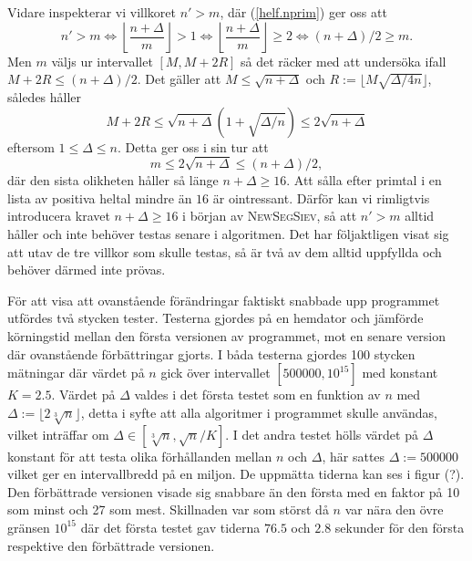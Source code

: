 Vidare inspekterar vi villkoret $n'>m$, där (\ref{helf.nprim}) ger oss att 
\begin{equation*}
    n'>m \iff
    \left\lfloor \frac{n+\Delta}{m} \right\rfloor > 1 \iff
    \left\lfloor \frac{n+\Delta}{m} \right\rfloor \geq 2 \iff
    (n+\Delta)/2\geq m.
\end{equation*}
Men $m$ väljs ur intervallet $[M,M+2R]$ så det räcker med att undersöka ifall $M+2R\leq(n+\Delta)/2$. 
Det gäller att $M\leq\sqrt{n+\Delta}$ och $R:=\lfloor M\sqrt{\Delta/4n}\rfloor$,
således håller 
\begin{equation*}
    M+2R \leq
    \sqrt{n+\Delta}\left(1+ \sqrt{\Delta/n}\right) \leq 2\sqrt{n+\Delta}
\end{equation*}
eftersom $1\leq\Delta\leq n$. Detta ger oss i sin tur att
\begin{equation*}
    m \leq 2\sqrt{n+\Delta} \leq (n+\Delta)/2,
\end{equation*}
där den sista olikheten håller så länge $n+\Delta\geq16$. 
Att sålla efter primtal i en lista av positiva heltal mindre än $16$ är ointressant.
Därför kan vi rimligtvis introducera kravet $n+\Delta\geq16$ i början av \textsc{NewSegSiev},
så att $n'>m$ alltid håller och inte behöver testas senare i algoritmen.
Det har följaktligen visat sig att utav de tre villkor som skulle testas, så är två av dem alltid uppfyllda och behöver därmed inte prövas.


För att visa att ovanstående förändringar faktiskt snabbade upp programmet utfördes två stycken tester.
Testerna gjordes på en hemdator och jämförde körningstid mellan den första versionen av programmet, mot en senare version där ovanstående förbättringar gjorts.
I båda testerna gjordes 100 stycken mätningar där värdet på $n$ gick över intervallet $[500000, 10^{15}]$ med konstant $K=2.5$.
Värdet på $\Delta$ valdes i det första testet som en funktion av $n$ med $\Delta := \lfloor2\sqrt[3]{n}\rfloor$,
detta i syfte att alla algoritmer i programmet skulle användas, vilket inträffar om $\Delta\in[\sqrt[3]{n},\sqrt{n}/K]$.
I det andra testet hölls värdet på $\Delta$ konstant för att testa olika förhållanden mellan $n$ och $\Delta$, här sattes $\Delta := 500000$ vilket ger en intervallbredd på en miljon. De uppmätta tiderna kan ses i figur (?). Den förbättrade versionen visade sig snabbare än den första med en faktor på 10 som minst och 27 som mest. Skillnaden var som störst då $n$ var nära den övre gränsen $10^{15}$ där det första testet gav tiderna $76.5$ och $2.8$ sekunder för den första respektive den förbättrade versionen.

